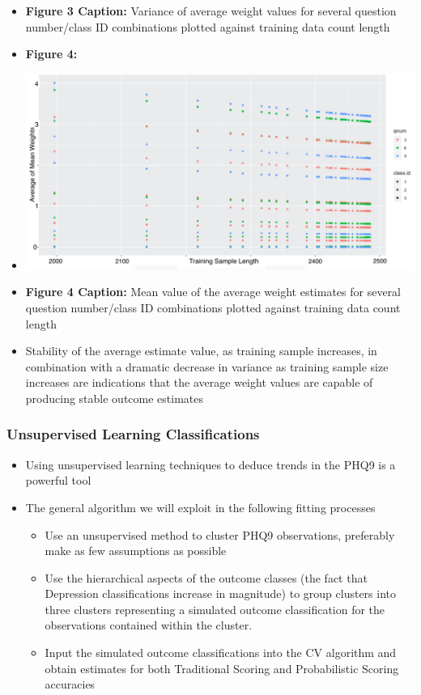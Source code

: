 \documentclass[12pt,]{article}
\providecommand{\tightlist}{%
  \setlength{\itemsep}{0pt}\setlength{\parskip}{0pt}}
\begin{document}
\begin{itemize}
\item
  \textbf{ Figure 3 Caption:} Variance of average weight values for
  several question number/class ID combinations plotted against training
  data count length
\item
  \textbf{Figure 4:}
\item
  \includegraphics{MeanPlot.jpg}
\item
  \textbf{Figure 4 Caption:} Mean value of the average weight estimates
  for several question number/class ID combinations plotted against
  training data count length
\item
  Stability of the average estimate value, as training sample increases,
  in combination with a dramatic decrease in variance as training sample
  size increases are indications that the average weight values are
  capable of producing stable outcome estimates
\end{itemize}

\hypertarget{unsupervised-learning-classifications}{%
\subsubsection{Unsupervised Learning
Classifications}\label{unsupervised-learning-classifications}}

\begin{itemize}
\tightlist
\item
  Using unsupervised learning techniques to deduce trends in the PHQ9 is
  a powerful tool
\item
  The general algorithm we will exploit in the following fitting
  processes

  \begin{itemize}
  \tightlist
  \item
    Use an unsupervised method to cluster PHQ9 observations, preferably
    make as few assumptions as possible
  \item
    Use the hierarchical aspects of the outcome classes (the fact that
    Depression classifications increase in magnitude) to group clusters
    into three clusters representing a simulated outcome classification
    for the observations contained within the cluster.
  \item
    Input the simulated outcome classifications into the CV algorithm
    and obtain estimates for both Traditional Scoring and Probabilistic
    Scoring accuracies
  \end{itemize}
\end{itemize}
\end{document}
